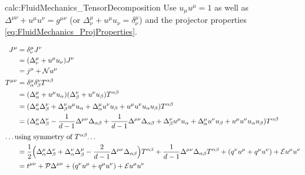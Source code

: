 \begin{calc}{calc:FluidMechanics_TensorDecomposition}
    Use $u_\mu u^\mu=1$ as well as $\Delta^{\mu\nu}+u^\mu u^\nu=g^{\mu\nu}$ (or $\Delta^\mu_\nu+u^\mu u_\nu=\delta^\mu_\nu$) and the projector properties \eqref{eq:FluidMechanics_ProjProperties}.


    \begin{align*}
        J^\mu      & =\delta^\mu_\nu J^\nu                                                                                                                                                                                                                                                       \\
                   & =(\Delta^\mu_\nu+u^\mu u_\nu)J^\nu                                                                                                                                                                                                                                          \\
                   & =j^\mu +\mathcal{N}u^\mu                                                                                                                                                                                                                                                    \\
        T^{\mu\nu} & =\delta^\mu_\alpha\delta^\nu_\beta T^{\alpha\beta}                                                                                                                                                                                                                          \\
                   & =(\Delta^\mu_\alpha+u^\mu u_\alpha)(\Delta^\nu_\beta+u^\nu u_\beta)T^{\alpha\beta}                                                                                                                                                                                          \\
                   & =(\Delta^\mu_\alpha\Delta^\nu_\beta+\Delta^\nu_\beta u^\mu u_\alpha+\Delta^\mu_\alpha u^\nu u_\beta + u^\mu  u^\nu u_\alpha u_\beta)T^{\alpha\beta}                                                                                                                         \\
                   & =(\Delta^\mu_\alpha\Delta^\nu_\beta-\frac{1}{d-1}\Delta^{\mu\nu}\Delta_{\alpha\beta}+\frac{1}{d-1}\Delta^{\mu\nu}\Delta_{\alpha\beta}+\Delta^\nu_\beta u^\mu u_\alpha+\Delta^\mu_\alpha u^\nu u_\beta + u^\mu  u^\nu u_\alpha u_\beta)T^{\alpha\beta}                       \\
        \intertext{\dots using symmetry of $T^{\alpha\beta}$\dots}
                   & =\frac{1}{2}\Big(\Delta^\mu_\alpha\Delta^\nu_\beta+\Delta^\nu_\alpha\Delta^\mu_\beta-\frac{2}{d-1}\Delta^{\mu\nu}\Delta_{\alpha\beta}\Big)T^{\alpha\beta}+\frac{1}{d-1}\Delta^{\mu\nu}\Delta_{\alpha\beta}T^{\alpha\beta}+(q^\nu u^\mu+q^\mu u^\nu)+\mathcal{E} u^\mu u^\nu \\
                   & =t^{\mu\nu}+\mathcal{P}\Delta^{\mu\nu}+(q^\nu u^\mu+q^\mu u^\nu)+\mathcal{E} u^\mu u^\nu
    \end{align*}


\end{calc}
